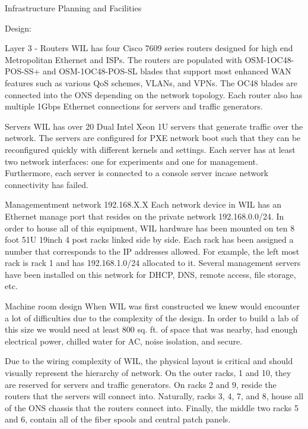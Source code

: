 \documentclass{IEEEtran}
\begin{document}
\begin{section}{Infrastructure Planning and Facilities}
\begin{subsection}{Design:}
\begin{subsubsection}{Layer 3 - Routers}
WIL has four Cisco 7609 series routers designed for high end Metropolitan
Ethernet and ISPs. The routers are populated with OSM-1OC48-POS-SS+  and
OSM-1OC48-POS-SL blades that support most enhanced WAN features such as
various QoS schemes, VLANs, and VPNs. The OC48 blades are connected into
the ONS depending on the network topology. Each router also has multiple
1Gbps Ethernet connections for servers and traffic generators.
\end{subsubsection}
\end{subsection}

\begin{subsection}{Servers}
WIL has over 20 Dual Intel Xeon 1U servers that generate traffic over the
network. The servers are configured for PXE network boot such that they
can be reconfigured quickly with different kernels and settings. Each
server has at least two network interfaces: one for experiments and one
for management. Furthermore, each server is connected to a console server
incase network connectivity has failed.
\end{subsection}

\begin{subsection}{Managementment network 192.168.X.X}
Each network device in WIL has an Ethernet manage port that resides on the
private network 192.168.0.0/24. In order to house all of this equipment,
WIL hardware has been mounted on ten 8 foot 51U 19inch 4 post racks linked
side by side. Each rack has been assigned a number that corresponds to
the IP addresses allowed. For example, the left most rack is rack 1 and
has 192.168.1.0/24 allocated to it. Several management servers have been
installed on this network for DHCP, DNS, remote access, file storage, etc.
\end{subsection}

\begin{subsection}{Machine room design}
When WIL was first constructed we knew would encounter a lot of
difficulties due to the complexity of the design. In order to build a lab
of this size we would need at least 800 sq. ft. of space that was nearby,
had enough electrical power, chilled water for AC, noise isolation,
and secure.

Due to the wiring complexity of WIL, the physical layout is critical and
should visually represent the hierarchy of network. On the outer racks,
1 and 10, they are reserved for servers and traffic generators. On racks 2  and 
9, reside the routers that the servers will connect into. Naturally,
racks 3, 4, 7, and 8, house all of the ONS chassis that the routers
connect into. Finally, the middle two racks 5 and 6, contain all of the
fiber spools and central patch panels.


\end{subsection}
\end{section}
\end{document}

